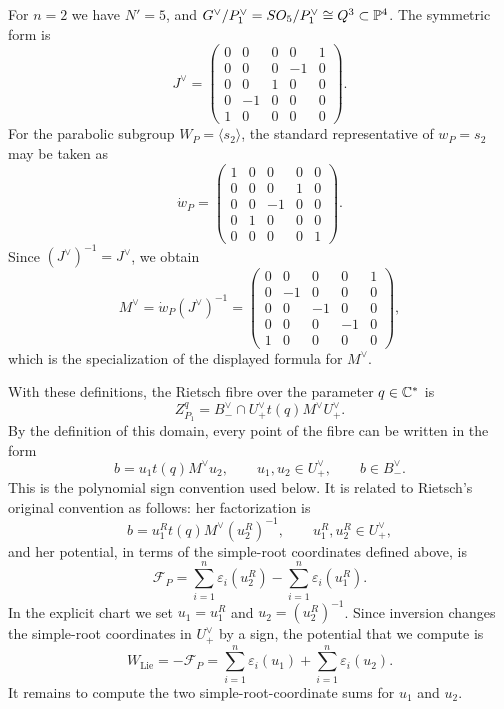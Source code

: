 \begin{exam}\label{ex:dual-n2-matrices}
For \(n=2\) we have \(N'=5\), and \(G^\vee/P_1^\vee=SO_5/P_1^\vee\cong Q^3\subset\mathbb{P}^4\). The symmetric form is
\[
J^\vee=
\begin{pmatrix}
0&0&0&0&1\\
0&0&0&-1&0\\
0&0&1&0&0\\
0&-1&0&0&0\\
1&0&0&0&0
\end{pmatrix}.
\]
For the parabolic subgroup \(W_P=\langle s_2\rangle\), the standard representative of \(w_P=s_2\) may be taken as
\[
\dot w_P=
\begin{pmatrix}
1&0&0&0&0\\
0&0&0&1&0\\
0&0&-1&0&0\\
0&1&0&0&0\\
0&0&0&0&1
\end{pmatrix}.
\]
Since \((J^\vee)^{-1}=J^\vee\), we obtain
\[
M^\vee=\dot w_P(J^\vee)^{-1}
=
\begin{pmatrix}
0&0&0&0&1\\
0&-1&0&0&0\\
0&0&-1&0&0\\
0&0&0&-1&0\\
1&0&0&0&0
\end{pmatrix},
\]
which is the specialization of the displayed formula for \(M^\vee\).
\end{exam}

With these definitions, the Rietsch fibre over the parameter \(q\in\mathbb{C}^*\) is
\[
Z_{P_1}^{q}
=
B_-^\vee\cap U_+^\vee t(q)M^\vee U_+^\vee .
\]
By the definition of this domain, every point of the fibre can be written in the form
\[
b=u_1t(q)M^\vee u_2,
\qquad
u_1,u_2\in U_+^\vee,
\qquad
b\in B_-^\vee .
\]
This is the polynomial sign convention used below. It is related to Rietsch's original convention as follows: her factorization is
\[
b=u_1^{R}t(q)M^\vee (u_2^{R})^{-1},
\qquad
u_1^{R},u_2^{R}\in U_+^\vee,
\]
and her potential, in terms of the simple-root coordinates defined above, is
\[
\mathcal F_P=
\sum_{i=1}^n\varepsilon_i(u_2^{R})
-
\sum_{i=1}^n\varepsilon_i(u_1^{R}).
\]
In the explicit chart we set \(u_1=u_1^{R}\) and \(u_2=(u_2^{R})^{-1}\). Since inversion changes the simple-root coordinates in \(U_+^\vee\) by a sign, the potential that we compute is
\[
W_{\mathrm{Lie}}=-\mathcal F_P
=
\sum_{i=1}^n\varepsilon_i(u_1)+\sum_{i=1}^n\varepsilon_i(u_2).
\]
It remains to compute the two simple-root-coordinate sums for \(u_1\) and \(u_2\).

